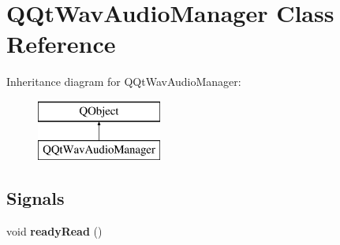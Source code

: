 \hypertarget{class_q_qt_wav_audio_manager}{}\section{Q\+Qt\+Wav\+Audio\+Manager Class Reference}
\label{class_q_qt_wav_audio_manager}
Inheritance diagram for Q\+Qt\+Wav\+Audio\+Manager\+:\begin{figure}[H]
\begin{center}
\leavevmode
\includegraphics[height=2.000000cm]{class_q_qt_wav_audio_manager}
\end{center}
\end{figure}
\subsection*{Signals}
\begin{DoxyCompactItemize}
\item 
\mbox{\label{class_q_qt_wav_audio_manager_a94bf61d3d6e3f8c4a13d781bb9c2739d}} 
void {\bfseries ready\+Read} ()
\end{DoxyCompactItemize}
